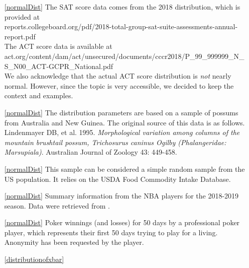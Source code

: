 \begin{itemize}
\item[\ref{normalDist}]
    The SAT score data comes from the 2018 distribution,
    which is provided at \\
    {\small
        {reports.collegeboard.org/pdf/2018-total-group-sat-suite-assessments-annual-report.pdf}} \\
    The ACT score data is available at \\
    {\footnotesize
        {act.org/content/dam/act/unsecured/documents/cccr2018/P\_99\_999999\_N\_S\_N00\_ACT-GCPR\_National.pdf}} \\
    We also acknowledge that the actual ACT score distribution
    is \emph{not} nearly normal.
    However, since the topic is very accessible,
    we decided to keep the context and examples.

\item[\ref{normalDist}]
    The distribution parameters are based on a sample
    of possums from Australia and New Guinea.
    The original source of this data is as follows.
    Lindenmayer DB, et al. 1995.
    \emph{Morphological variation among columns of the
        mountain brushtail possum, Trichosurus caninus
        Ogilby (Phalangeridae: Marsupiala)}.
    Australian Journal of Zoology 43: 449-458.

\item[\ref{normalDist}]
    This sample can be considered a simple random sample
    from the US population.
    It relies on the USDA Food Commodity Intake Database.
\item[\ref{normalDist}]
    Summary information from the NBA players for the
    2018-2019 season.
    Data were retrieved from
   .
\item[\ref{normalDist}]
    Poker winnings (and losses) for 50 days by a professional
    poker player, which represents their first 50 days trying
    to play for a living.
    Anonymity has been requested by the player.


\item[\ref{distributionofxbar}]


\end{itemize}








